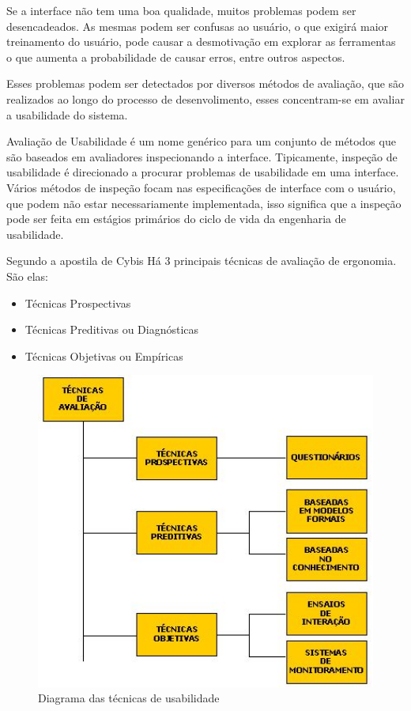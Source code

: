 Se a interface não tem uma boa qualidade, muitos problemas podem ser desencadeados. As mesmas podem ser confusas ao usuário, o que exigirá maior treinamento do usuário, pode causar a desmotivação em explorar as ferramentas o que aumenta a probabilidade de causar erros, entre outros aspectos.

Esses problemas podem ser detectados por diversos métodos de avaliação, que são realizados ao longo do processo de desenvolimento, esses concentram-se em avaliar a usabilidade do sistema.

Avaliação de Usabilidade é um nome genérico para um conjunto de métodos que são baseados em avaliadores inspecionando a interface. Tipicamente, inspeção de usabilidade é direcionado a procurar problemas de usabilidade em uma interface. Vários métodos de inspeção focam nas especificações de interface com o usuário, que podem não estar necessariamente implementada, isso significa que a inspeção pode ser feita em estágios primários do ciclo de vida da engenharia de usabilidade. \cite{nielsen_95}

Segundo a apostila de Cybis \cite{cybil_apostila} Há 3 principais técnicas de avaliação de ergonomia. São elas:

\begin{itemize}
  \item Técnicas Prospectivas
  \item Técnicas Preditivas ou Diagnósticas
  \item Técnicas Objetivas ou Empíricas
\end{itemize}

\begin{figure}[here]
\includegraphics[width=120mm]{images/tecnicas_usabilidade.jpg}
\caption{Diagrama das técnicas de usabilidade}
\label{fig:tecnicas_usabilidade}
\end{figure}

